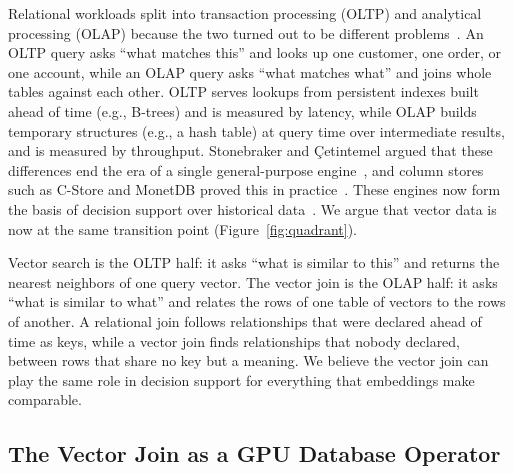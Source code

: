 Relational workloads split into transaction processing (OLTP) and analytical processing (OLAP) because the two turned out to be different problems~\cite{StonebrakerPavloAround24}.
An OLTP query asks ``what matches this'' and looks up one customer, one order, or one account, while an OLAP query asks ``what matches what'' and joins whole tables against each other.
OLTP serves lookups from persistent indexes built ahead of time (e.g., B-trees) and is measured by latency, while OLAP builds temporary structures (e.g., a hash table) at query time over intermediate results, and is measured by throughput.
Stonebraker and \c{C}etintemel argued that these differences end the era of a single general-purpose engine~\cite{StonebrakerOneSize05}, and column stores such as C-Store and MonetDB proved this in practice~\cite{StonebrakerCStore05, IdreosMonetDB12}.
These engines now form the basis of decision support over historical data~\cite{ChaudhuriDayal97}.
We argue that vector data is now at the same transition point (Figure~\ref{fig:quadrant}).

Vector search is the OLTP half: it asks ``what is similar to this'' and returns the nearest neighbors of one query vector.
The vector join is the OLAP half: it asks ``what is similar to what'' and relates the rows of one table of vectors to the rows of another.
A relational join follows relationships that were declared ahead of time as keys, while a vector join finds relationships that nobody declared, between rows that share no key but a meaning.
We believe the vector join can play the same role in decision support for everything that embeddings make comparable.

\subsection{The Vector Join as a GPU Database Operator}\label{subsec:why-gpu-database}


